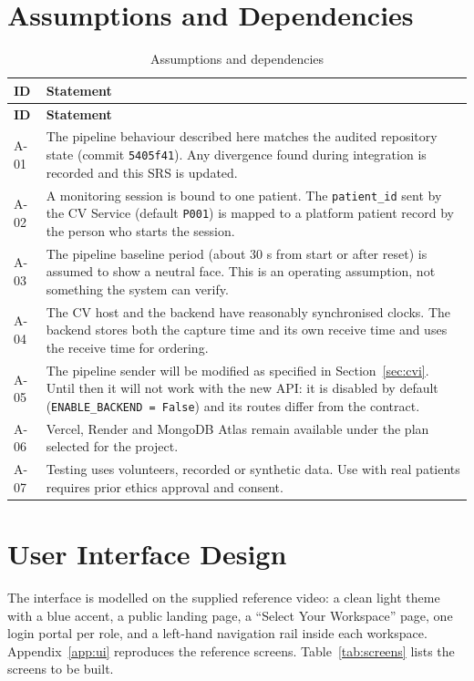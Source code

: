 \documentclass[a4paper,11pt]{scrreprt}
\makeatletter
\newcommand{\code}[1]{\texttt{#1}}
\newenvironment{idtable}[1]{%
  \small
  \begin{longtable}{@{}>{\ttfamily\footnotesize}p{1.9cm}>{\raggedright\arraybackslash}p{13.2cm}@{}}
  \caption{#1}\\
  \toprule \textbf{ID} & \textbf{Statement}\\ \midrule
  \endfirsthead
  \toprule \textbf{ID} & \textbf{Statement}\\ \midrule
  \endhead
  \bottomrule
  \endfoot
}{%
  \end{longtable}\normalsize
}
\newcommand{\idr}[2]{#1 & #2 \\ \midrule}
\makeatother
\begin{document}
\section{Assumptions and Dependencies}\label{sec:assumptions}
\begin{idtable}{Assumptions and dependencies}
\idr{A-01}{The pipeline behaviour described here matches the audited repository state (commit \code{5405f41}). Any divergence found during integration is recorded and this SRS is updated.}
\idr{A-02}{A monitoring session is bound to one patient. The \code{patient_id} sent by the CV Service (default \code{P001}) is mapped to a platform patient record by the person who starts the session.}
\idr{A-03}{The pipeline baseline period (about 30 s from start or after reset) is assumed to show a neutral face. This is an operating assumption, not something the system can verify.}
\idr{A-04}{The CV host and the backend have reasonably synchronised clocks. The backend stores both the capture time and its own receive time and uses the receive time for ordering.}
\idr{A-05}{The pipeline sender will be modified as specified in Section~\ref{sec:cvi}. Until then it will not work with the new API: it is disabled by default (\code{ENABLE_BACKEND = False}) and its routes differ from the contract.}
\idr{A-06}{Vercel, Render and MongoDB Atlas remain available under the plan selected for the project.}
\idr{A-07}{Testing uses volunteers, recorded or synthetic data. Use with real patients requires prior ethics approval and consent.}
\end{idtable}

\section{User Interface Design}\label{sec:ui}
The interface is modelled on the supplied reference video: a clean light theme with a blue accent, a public landing page, a ``Select Your Workspace'' page, one login portal per role, and a left-hand navigation rail inside each workspace. Appendix~\ref{app:ui} reproduces the reference screens. Table~\ref{tab:screens} lists the screens to be built.
\end{document}
